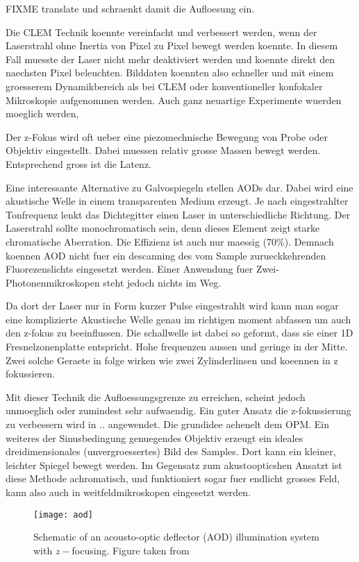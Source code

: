 FIXME translate und schraenkt damit die Aufloesung ein.

Die CLEM Technik koennte vereinfacht und verbessert werden, wenn der
Laserstrahl ohne Inertia von Pixel zu Pixel bewegt werden koennte. In
diesem Fall muesste der Laser nicht mehr deaktiviert werden und
koennte direkt den naechsten Pixel beleuchten. Bilddaten koennten also
schneller und mit einem groesserem Dynamikbereich als bei CLEM oder
konventioneller konfokaler Mikroskopie aufgenommen werden.
Auch ganz neuartige Experimente wuerden moeglich werden, 


Der z-Fokus wird oft ueber eine piezomechnische Bewegung von Probe
oder Objektiv eingestellt. Dabei muessen relativ grosse Massen bewegt
werden. Entsprechend gross ist die Latenz.

Eine interessante Alternative zu Galvospiegeln stellen AODs dar. Dabei
wird eine akustische Welle in einem transparenten Medium erzeugt. Je
nach eingestrahlter Tonfrequenz lenkt das Dichtegitter einen Laser in
unterschiedliche Richtung. Der Laserstrahl sollte monochromatisch
sein, denn dieses Element zeigt starke chromatische Aberration. Die
Effizienz ist auch nur maessig (70\%). Demnach koennen AOD nicht fuer
ein descanning des vom Sample zurueckkehrenden Fluorezenslichts
eingesetzt werden. Einer Anwendung fuer Zwei-Photonenmikroskopen steht
jedoch nichts im Weg.

Da dort der Laser nur in Form kurzer Pulse eingestrahlt wird kann man
sogar eine komplizierte Akustische Welle genau im richtigen moment
abfassen um auch den z-fokus zu beeinflussen. Die schallwelle ist
dabei so geformt, dass sie einer 1D Fresnelzonenplatte
entspricht. Hohe frequenzen aussen und geringe in der Mitte. Zwei
solche Geraete in folge wirken wie zwei Zylinderlinsen und koeennen in
z fokussieren.

Mit dieser Technik die Aufloessungsgrenze zu erreichen, scheint jedoch
unmoeglich oder zumindest sehr aufwaendig. Ein guter Ansatz die
z-fokussierung zu verbessern wird in .. angewendet. Die grundidee
aehenelt dem OPM. Ein weiteres der Sinusbedingung genuegendes Objektiv
erzeugt ein ideales dreidimensionales (unvergroessertes) Bild des
Samples. Dort kann ein kleiner, leichter Spiegel bewegt werden. Im
Gegensatz zum akustoopticshen Ansatzt ist diese Methode achromatisch,
und funktioniert sogar fuer endlicht grosses Feld, kann also auch in
weitfeldmikroskopen eingesetzt werden.

\begin{figure}[htbp]
  \centering
  \texttt{[image: aod]} 
  \caption{Schematic of an acousto-optic deflector (AOD) illumination
    system with $z-$focusing. Figure taken from \citet{Reddy2008}}
  \label{fig:aod}
\end{figure}


